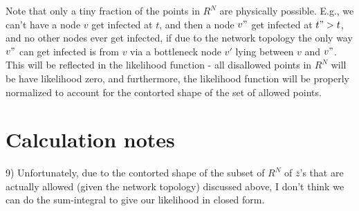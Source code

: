 \documentclass{article}
\begin{document}

	



	Note that only a tiny fraction of the points in $R^{N}$ are physically
	possible. E.g., we can't have a node $v$ get infected at $t$, and then a
	node $v"$ get infected at $t" > t$, and no other nodes ever get infected,
	if due to the network topology the only way $v"$ can get infected is
	from $v$ via a bottleneck node $v'$ lying between $v$ and $v"$. This will be
	reflected in the likelihood function - all disallowed points in $R^{N}$
	will be have likelihood zero, and furthermore, the likelihood function
	will be properly normalized to account for the contorted shape of the
	set of allowed points.

\section{Calculation notes}

        9) Unfortunately, due to the contorted shape of the subset of
        $R^N$ of $\bar{z}$'s that are actually allowed (given the network topology)
        discussed above, I don't think we can do the sum-integral to give our
        likelihood in closed form. %

\end{document}
